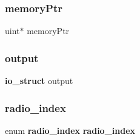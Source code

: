 \mbox{\label{io_8h_afe03a92b44c4a0ff4b7d6b26d3709cca}} 
\subsubsection{memory\+Ptr}
{\footnotesize\ttfamily uint$\ast$ memory\+Ptr}

\mbox{\label{io_8h_a79ebc0442e8db12cc3adef891a59709b}} 
\subsubsection{output}
{\footnotesize\ttfamily \textbf{ io\+\_\+struct} output}

\mbox{\label{io_8h_a6c09e9d766f8305096643ee574eb633f}} 
\subsubsection{radio\+\_\+index}
{\footnotesize\ttfamily enum \textbf{ radio\+\_\+index}  \textbf{ radio\+\_\+index}}

